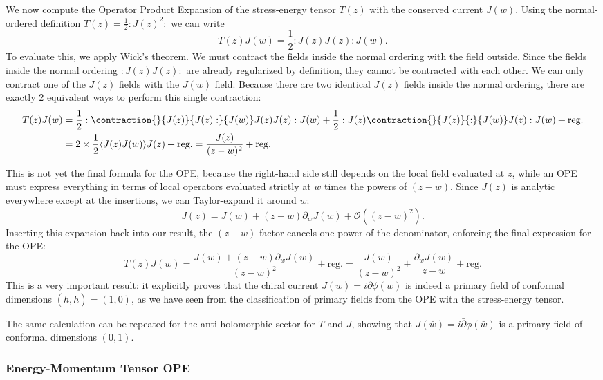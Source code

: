 We now compute the Operator Product Expansion of the stress-energy tensor \(T(z)\) with the conserved current \(J(w)\). Using the normal-ordered definition \(T(z) = \frac{1}{2} :J(z)^2:\) we can write
\[
    T(z)J(w) = \frac{1}{2} :J(z)J(z): J(w).
\]
To evaluate this, we apply Wick's theorem. We must contract the fields inside the normal ordering with the field outside. Since the fields inside the normal ordering \(:J(z)J(z):\) are already regularized by definition, they cannot be contracted with each other. We can only contract one of the \(J(z)\) fields with the \(J(w)\) field. Because there are two identical \(J(z)\) fields inside the normal ordering, there are exactly 2 equivalent ways to perform this single contraction:
\[
    \begin{aligned}
        T(z)J(w) & = \frac{1}{2} : \contraction{}{J(z)}{J(z):}{J(w)} J(z) J(z): J(w) + \frac{1}{2} : J(z) \contraction{}{J(z)}{:}{J(w)} J(z): J(w) + \text{reg.} \\
                 & = 2 \times \frac{1}{2} \langle J(z)J(w) \rangle J(z) + \text{reg.} = \frac{J(z)}{(z-w)^2} + \text{reg.}
    \end{aligned}
\]

This is not yet the final formula for the OPE, because the right-hand side still depends on the local field evaluated at \(z\), while an OPE must express everything in terms of local operators evaluated strictly at \(w\) times the powers of \((z-w)\). Since \(J(z)\) is analytic everywhere except at the insertions, we can Taylor-expand it around \(w\):
\[
    J(z) = J(w) + (z-w)\partial_w J(w) + \mathcal{O} ((z-w)^2).
\]
Inserting this expansion back into our result, the \((z-w)\) factor cancels one power of the denominator, enforcing the final expression for the OPE:
\[
    T(z)J(w) = \frac{J(w) + (z-w)\partial_w J(w)}{(z-w)^2} + \text{reg.} = \frac{J(w)}{(z-w)^2} + \frac{\partial_w J(w)}{z-w} + \text{reg.}
\]
This is a very important result: it explicitly proves that the chiral current \(J(w) = i\partial\phi(w)\) is indeed a primary field of conformal dimensions \((h, \bar{h}) = (1, 0)\), as we have seen from the classification of primary fields from the OPE with the stress-energy tensor.

The same calculation can be repeated for the anti-holomorphic sector for \(\bar{T}\) and \(\bar{J}\), showing that \(\bar{J}(\bar{w}) = i\bar{\partial}\bar{\phi}(\bar{w})\) is a primary field of conformal dimensions \((0, 1)\).

\subsubsection{Energy-Momentum Tensor OPE}

